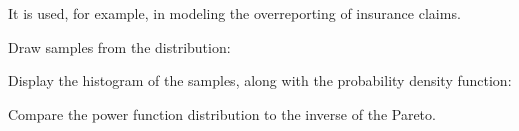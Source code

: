 \documentclass[letterpaper,10pt,english]{sphinxmanual}
\begin{document}
\begin{fulllineitems}
It is used, for example, in modeling the over\sphinxhyphen{}reporting of insurance
claims.

Draw samples from the distribution:

\begin{sphinxVerbatim}[commandchars=\\\{\}]
   
  
   
\end{sphinxVerbatim}

Display the histogram of the samples, along with
the probability density function:

\begin{sphinxVerbatim}[commandchars=\\\{\}]
   
     
    
  
  \PYG{p}{[}\PYG{p}{]}
 
\end{sphinxVerbatim}

Compare the power function distribution to the inverse of the Pareto.


\end{fulllineitems}
\end{document}
